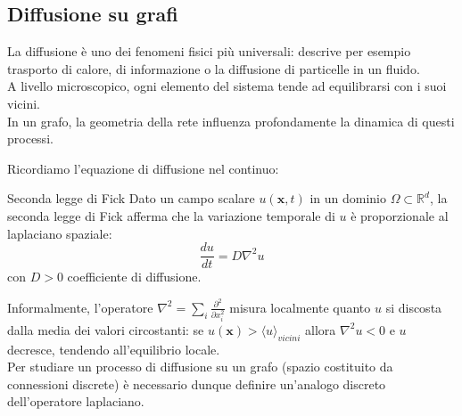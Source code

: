 \subsection{Diffusione su grafi}
La diffusione è uno dei fenomeni fisici più universali: descrive per esempio trasporto di calore, di informazione o la diffusione di particelle in un fluido.\\
A livello microscopico, ogni elemento del sistema tende ad equilibrarsi con i suoi vicini.\\
In un grafo, la geometria della rete influenza profondamente la dinamica di questi processi.

Ricordiamo l'equazione di diffusione nel continuo:
\begin{boxl}{Seconda legge di Fick}
Dato un campo scalare $u(\mathbf{x},t)$ in un dominio $\Omega \subset \mathbb{R}^d$, la seconda legge di Fick afferma che la variazione temporale di $u$ è proporzionale al laplaciano spaziale:
\begin{equation}
    \frac{du}{dt} = D \nabla^2u
\end{equation}
con $D >0$ coefficiente di diffusione.
\end{boxl}
Informalmente, l'operatore $\nabla^2=\sum_{i}^{}\frac{\partial^2}{\partial x_i^2}$ misura localmente quanto $u$ si discosta dalla media dei valori circostanti: se $u(\mathbf{x}) > \langle  u \rangle_{vicini}$ allora $\nabla^2 u < 0$ e $u$ decresce, tendendo all'equilibrio locale.\\

Per studiare un processo di diffusione su un grafo (spazio costituito da connessioni discrete) è necessario dunque definire un'analogo discreto dell'operatore laplaciano.\\

